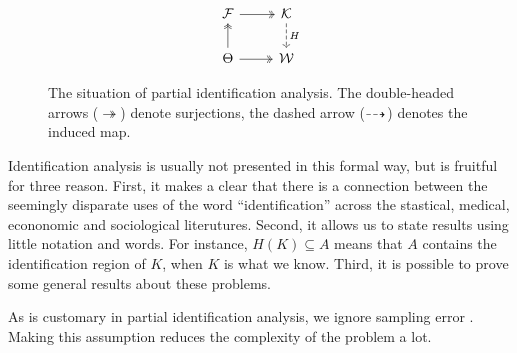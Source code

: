 \begin{figure}
\noindent \begin{centering}
\[
\begin{tikzcd}
\mathcal{F} \arrow[twoheadrightarrow]{r} & \mathcal{K} \arrow[dashed]{d}{H} \\
\Theta      \arrow[twoheadrightarrow]{u} \arrow[twoheadrightarrow]{r}  & \mathcal{W}
\end{tikzcd}
\]
\par\end{centering}
\caption{\label{fig:partial identifiaction situation-1}The situation of partial
identification analysis. The double-headed arrows ($\twoheadrightarrow$)
denote surjections, the dashed arrow ($\protect\dashrightarrow$)
denotes the induced map.}
\end{figure}

Identification analysis is usually not presented in this formal way,
but is fruitful for three reason. First, it makes a clear that there is a connection
between the seemingly disparate uses of the word ``identification''
across the stastical, medical, econonomic and sociological literutures.
Second, it allows us to state results using little notation and words.
For instance, $H(K)\subseteq A$ means that $A$ contains the identification
region of $K$, when $K$ is what we know. Third, it is possible to prove some general results
about these problems.

As is customary in partial identification analysis, we ignore sampling
error \parencite{Manski2003-aq}. Making this assumption reduces the complexity
of the problem a lot. 

